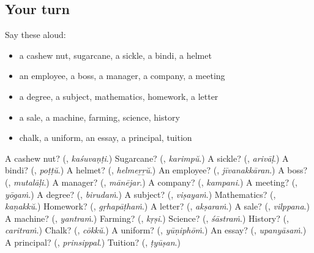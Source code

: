 \subsection*{Your turn}
Say these aloud:

\begin{itemize}
\raggedright
  \item a cashew nut, sugarcane, a sickle, a bindi, a helmet
  \item an employee, a boss, a manager, a company, a meeting
  \item a degree, a subject, mathematics, homework, a letter
  \item a sale, a machine, farming, science, history
  \item chalk, a uniform, an essay, a principal, tuition
\end{itemize}

\begin{tcolorbox}[breakable,colback=teal!4,colframe=teal!35!black,title={Before you move on}]
A cashew nut? (\textbf{}, \emph{kaśuvaṇṭi}.) Sugarcane? (\textbf{}, \emph{karimpŭ}.) A sickle? (\textbf{}, \emph{arivāḷ}.) A bindi? (\textbf{}, \emph{poṭṭŭ}.) A helmet? (\textbf{}, \emph{helmeṟṟŭ}.) An employee? (\textbf{}, \emph{jīvanakkāran}.) A boss? (\textbf{}, \emph{mutalāḷi}.) A manager? (\textbf{}, \emph{mānējar}.) A company? (\textbf{}, \emph{kampani}.) A meeting? (\textbf{}, \emph{yōgaṁ}.) A degree? (\textbf{}, \emph{birudaṁ}.) A subject? (\textbf{}, \emph{viṣayaṁ}.) Mathematics? (\textbf{}, \emph{kaṇakkŭ}.) Homework? (\textbf{}, \emph{gṛhapāṭhaṁ}.) A letter? (\textbf{}, \emph{akṣaraṁ}.) A sale? (\textbf{}, \emph{vilppana}.) A machine? (\textbf{}, \emph{yantraṁ}.) Farming? (\textbf{}, \emph{kṛṣi}.) Science? (\textbf{}, \emph{śāstraṁ}.) History? (\textbf{}, \emph{caritraṁ}.) Chalk? (\textbf{}, \emph{cōkkŭ}.) A uniform? (\textbf{}, \emph{yūṇiphōṁ}.) An essay? (\textbf{}, \emph{upanyāsaṁ}.) A principal? (\textbf{}, \emph{prinsippal}.) Tuition? (\textbf{}, \emph{ṭyūṣan}.)
\end{tcolorbox}

